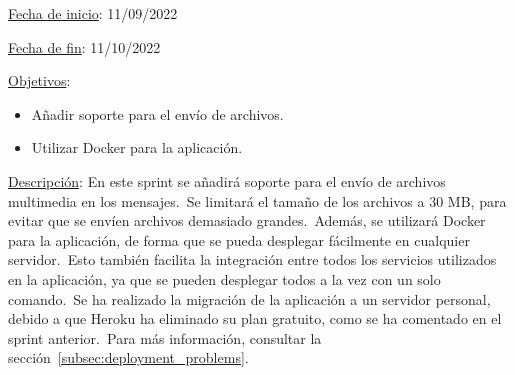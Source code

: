 
\underline{Fecha de inicio}: 11/09/2022

\underline{Fecha de fin}: 11/10/2022

\underline{Objetivos}:
\begin{itemize}
	\item Añadir soporte para el envío de archivos.
	\item Utilizar Docker para la aplicación.
\end{itemize}

\underline{Descripción}:
En este sprint se añadirá soporte para el envío de archivos multimedia en los mensajes.\ Se limitará el tamaño de
los archivos a 30 MB, para evitar que se envíen archivos demasiado grandes.\ Además, se utilizará Docker para
la aplicación, de forma que se pueda desplegar fácilmente en cualquier servidor.\ Esto también facilita la integración
entre todos los servicios utilizados en la aplicación, ya que se pueden desplegar todos a la vez con un solo
comando.\ Se ha realizado la migración de la aplicación a un servidor personal, debido a que Heroku ha eliminado
su plan gratuito, como se ha comentado en el sprint anterior.\ Para más información, consultar la
sección~\ref{subsec:deployment_problems}.


